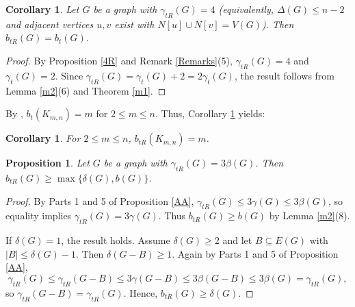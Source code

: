 \documentclass[12pt,reqno]{amsart}
\theoremstyle{plain}
\newtheorem{corollary}[theorem]{Corollary}
\newtheorem{proposition}[theorem]{Proposition}
\numberwithin{equation}{section}
\begin{document}
\begin{corollary}\label{ccc}
Let $G$ be a graph with $\gamma_{tR}(G) = 4$ (equivalently, $\Delta(G) \leq n-2$ and adjacent vertices $u,v$ exist with $N[u] \cup N[v] = V(G)$). Then $b_{tR}(G) = b_t(G)$.
\end{corollary}
\begin{proof}
By Proposition \ref{4R} and Remark \ref{Remarks}(5), $\gamma_{tR}(G) = 4$ and $\gamma_t(G) = 2$. Since $\gamma_{tR}(G) = \gamma_t(G) + 2 = 2\gamma_t(G)$, the result follows from Lemma \ref{m2}(6) and Theorem \ref{m1}.
\end{proof}

By \cite[Theorem 5]{kul}, $b_t(K_{m,n}) = m$ for $2 \leq m \leq n$. Thus, Corollary \ref{ccc} yields:

\begin{corollary}
For $2\leq m\leq n$, $b_{tR}(K_{m,n})=m$.
\end{corollary}

\begin{proposition}
Let $G$ be a graph with $\gamma_{tR}(G)=3 \beta(G)$. Then $b_{tR}(G) \geq \max \{\delta(G), b(G)\}$.
\end{proposition}
\begin{proof}
By Parts 1 and 5 of Proposition \ref{AA}, $\gamma_{tR}(G) \leq 3\gamma(G) \leq 3\beta(G)$, so equality implies $\gamma_{tR}(G) = 3\gamma(G)$. Thus $b_{tR}(G) \geq b(G)$ by Lemma \ref{m2}(8).

If $\delta(G) = 1$, the result holds. Assume $\delta(G) \geq 2$ and let $B \subseteq E(G)$ with $|B| \leq \delta(G) - 1$. Then $\delta(G - B) \geq 1$. Again by Parts 1 and 5 of Proposition \ref{AA},
$$\gamma_{tR}(G) \leq \gamma_{tR}(G - B) \leq 3\gamma(G - B) \leq 3\beta(G - B) \leq 3\beta(G) = \gamma_{tR}(G),$$
so $\gamma_{tR}(G - B) = \gamma_{tR}(G)$. Hence, $b_{tR}(G) \geq \delta(G)$.
\end{proof}
\end{document}

